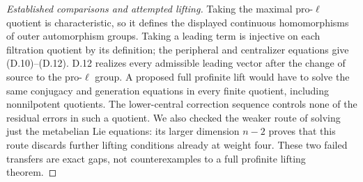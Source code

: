\begin{proof}[Established comparisons and attempted lifting]
Taking the maximal pro-$\ell$ quotient is characteristic, so it defines the displayed continuous homomorphisms of outer automorphism groups. Taking a leading term is injective on each filtration quotient by its definition; the peripheral and centralizer equations give (D.10)--(D.12). D.12 realizes every admissible leading vector after the change of source to the pro-$\ell$ group. A proposed full profinite lift would have to solve the same conjugacy and generation equations in every finite quotient, including nonnilpotent quotients. The lower-central correction sequence controls none of the residual errors in such a quotient. We also checked the weaker route of solving just the metabelian Lie equations: its larger dimension $n-2$ proves that this route discards further lifting conditions already at weight four. These two failed transfers are exact gaps, not counterexamples to a full profinite lifting theorem.


\end{proof}
